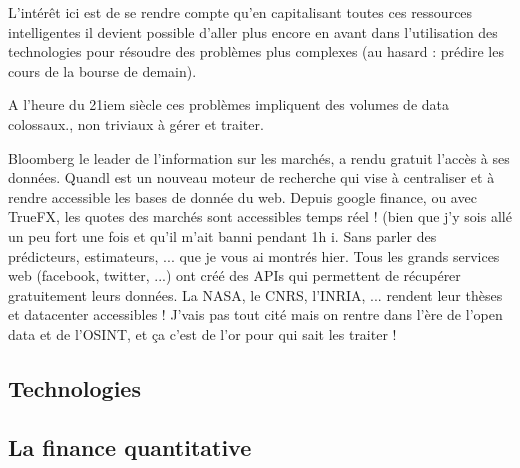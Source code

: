 L'intérêt ici est de se rendre compte qu'en capitalisant toutes ces
ressources intelligentes il devient possible d'aller plus encore en avant dans
l'utilisation des technologies pour résoudre des problèmes plus complexes
(au hasard : prédire les cours de la bourse de demain).\newline
\newline

A l'heure du 21iem siècle ces problèmes impliquent des volumes de data
colossaux., non triviaux à gérer et traiter.


  \item Bloomberg
    le leader de l’information sur les marchés, a rendu
gratuit l'accès à ses données.  Quandl est un nouveau moteur de recherche qui
vise à centraliser et à rendre accessible les bases de donnée du web.  Depuis
google finance, ou avec TrueFX, les quotes des marchés sont accessibles temps
réel ! (bien que j'y sois allé un peu fort une fois et qu'il m'ait banni
pendant 1h ^^).  Sans parler des prédicteurs, estimateurs, ... que je vous ai
montrés hier.  Tous les grands services web (facebook, twitter, ...) ont créé
des APIs qui permettent de récupérer gratuitement leurs données.  La NASA, le
CNRS, l'INRIA, ... rendent leur thèses et datacenter accessibles !  J'vais
pas tout cité mais on rentre dans l'ère de l'open data et de l'OSINT, et ça
c'est de l'or pour qui sait les traiter !

\subsection{Technologies}

\subsection{La finance quantitative}

